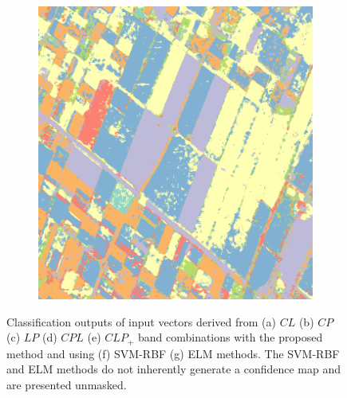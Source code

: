 \begin{figure}[tp]
\begin{subfigure}[b]{0.24\textwidth}
                  \caption{}
                  \label{fig:SVM}
        \end{subfigure}
        ~
        \begin{subfigure}[b]{0.24\textwidth}
                        \includegraphics[width=\textwidth]{Figures/Kron/ELM_COLOR}
                        \caption{}
                        \label{fig:ELM}
        \end{subfigure}
    \caption{Classification outputs of input vectors derived from (a) $CL$ (b) $CP$ (c) $LP$ (d) $CPL$ (e) $CLP_{+}$ band combinations with the proposed method and using (f) SVM-RBF (g) ELM methods. The SVM-RBF and ELM methods do not inherently generate a confidence map and are presented unmasked.}\label{fig:MultiFreq}
\end{figure}

